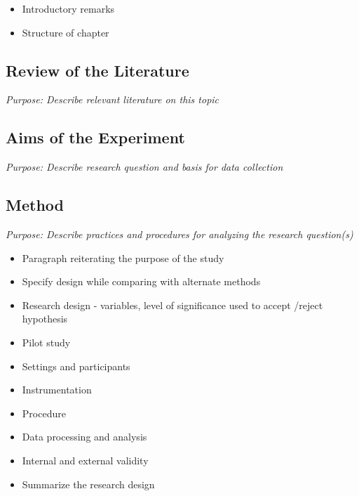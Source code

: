 \begin{itemize}
\item Introductory remarks

\item Structure of chapter

\end{itemize}

\subsection{Review of the Literature}
\label{reviewoftheliterature}

\emph{Purpose: Describe relevant literature on this topic}

\subsection{Aims of the Experiment}
\label{aimsoftheexperiment}

\emph{Purpose: Describe research question and basis for data collection}

\subsection{Method}
\label{method}

\emph{Purpose: Describe practices and procedures for analyzing the research question(s)}

\begin{itemize}
\item Paragraph reiterating the purpose of the study

\item Specify design while comparing with alternate methods

\item Research design - variables, level of significance used to accept \slash  reject hypothesis

\item Pilot study

\item Settings and participants

\item Instrumentation

\item Procedure

\item Data processing and analysis

\item Internal and external validity

\item Summarize the research design

\end{itemize}

